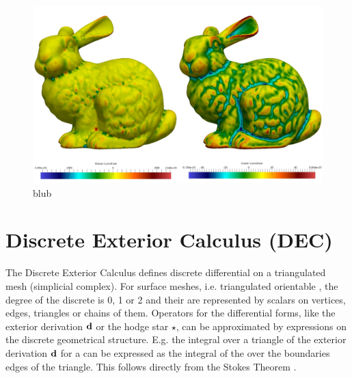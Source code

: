   
  \begin{figure}
    \centering
    \includegraphics[width=.45\textwidth]{bilder/bunnyCurvature.jpg}
    \caption{blub}
    \label{figBunnyCurvature}
  \end{figure}


\section{Discrete Exterior Calculus (DEC)}
  The Discrete Exterior Calculus \citep{hirani, desbrun} defines discrete differential  on a triangulated mesh (simplicial complex).
  For surface meshes, i.e. triangulated orientable , the degree of the discrete  is 0, 1 or 2
  and their are represented by scalars on vertices, edges, triangles or chains of them. 
  Operators for the differential forms, like the exterior derivation \( \mathbf{d} \) or the hodge star \( \star \), can be approximated by expressions on the discrete
  geometrical structure. 
  E.g. the integral over a triangle of the exterior derivation \( \mathbf{d} \) for a  can be expressed as the integral of the
   over the boundaries edges of the triangle. 
  This follows directly from the Stokes Theorem \citep[Ch. 7]{marsden}. 
 
